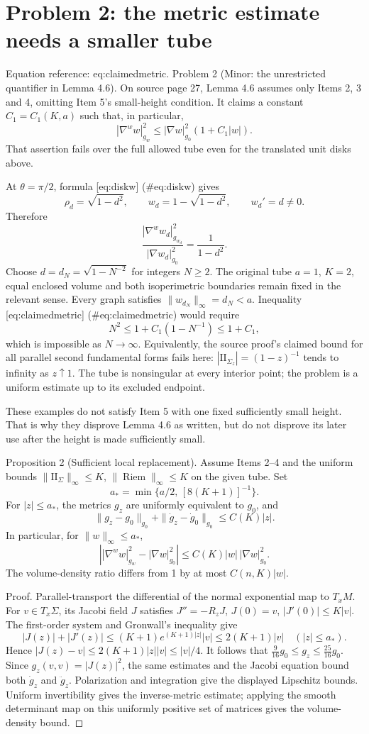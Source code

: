\documentclass[10pt]{article}
\begin{document}
\section*{Problem 2: the metric estimate needs a smaller tube}
Equation reference: eq:claimedmetric. Problem 2 (Minor: the unrestricted quantifier in Lemma 4.6).  On source page 27, Lemma 4.6 assumes only Items 2, 3 and 4, omitting Item 5’s small-height condition. It claims a constant \(C_1=C_1(K,a)\) such that, in particular, \[
 |\nabla^w w|_{g_w}^2
 \leq |\nabla w|_{g_0}^2(1+C_1|w|).\] That assertion fails over the full allowed tube even for the translated unit disks above.\par
At \(\theta=\pi/2\), formula [eq:diskw] (\#eq:diskw) gives \[\rho_d=\sqrt{1-d^2},\qquad
 w_d=1-\sqrt{1-d^2},\qquad w_d'=d\ne0 .\] Therefore \[\frac{|\nabla^w w_d|_{g_{w_d}}^2}
      {|\nabla w_d|_{g_0}^2}
 =\frac1{1-d^2}.\] Choose \(d=d_N=\sqrt{1-N^{-2}}\) for integers \(N\geq2\). The original tube \(a=1\), \(K=2\), equal enclosed volume and both isoperimetric boundaries remain fixed in the relevant sense. Every graph satisfies \(\|w_{d_N}\|_\infty=d_N<a\). Inequality [eq:claimedmetric] (\#eq:claimedmetric) would require \[N^2\leq1+C_1(1-N^{-1})\leq1+C_1 ,\] which is impossible as \(N\to\infty\). Equivalently, the source proof’s claimed bound for all parallel second fundamental forms fails here: \(|\mathrm{II}_{\Sigma_z}|=(1-z)^{-1}\) tends to infinity as \(z\uparrow1\). The tube is nonsingular at every interior point; the problem is a uniform estimate up to its excluded endpoint.\par
These examples do not satisfy Item 5 with one fixed sufficiently small height. That is why they disprove Lemma 4.6 as written, but do not disprove its later use after the height is made sufficiently small.\par
Proposition 2 (Sufficient local replacement).  Assume Items 2–4 and the uniform bounds \(\|\mathrm{II}_\Sigma\|_\infty\leq K\), \(\|\operatorname{Riem}\|_\infty\leq K\) on the given tube. Set \[a_*=\min\{a/2,\,[8(K+1)]^{-1}\}.\] For \(|z|\leq a_*\), the metrics \(g_z\) are uniformly equivalent to \(g_0\), and \[\|g_z-g_0\|_{g_0}+\|\dot g_z-\dot g_0\|_{g_0}\leq C(K)|z|.\] In particular, for \(\|w\|_\infty\leq a_*\), \[\left||\nabla^w w|_{g_w}^2-|\nabla w|_{g_0}^2\right|
 \leq C(K)|w|\,|\nabla w|_{g_0}^2 .\] The volume-density ratio differs from 1 by at most \(C(n,K)|w|\).\par
Proof. Parallel-transport the differential of the normal exponential map to \(T_xM\). For \(v\in T_x\Sigma\), its Jacobi field \(J\) satisfies \(J''=-R_zJ\), \(J(0)=v\), \(|J'(0)|\leq K|v|\). The first-order system and Gronwall’s inequality give \[|J(z)|+|J'(z)|
 \leq (K+1)e^{(K+1)|z|}|v|
 \leq 2(K+1)|v|
 \quad (|z|\leq a_*).\] Hence \(|J(z)-v|\leq2(K+1)|z||v|\leq|v|/4\). It follows that \(\tfrac9{16}g_0\leq g_z\leq\tfrac{25}{16}g_0\). Since \(g_z(v,v)=|J(z)|^2\), the same estimates and the Jacobi equation bound both \(\dot g_z\) and \(\ddot g_z\). Polarization and integration give the displayed Lipschitz bounds. Uniform invertibility gives the inverse-metric estimate; applying the smooth determinant map on this uniformly positive set of matrices gives the volume-density bound. ◻\par
\end{document}
